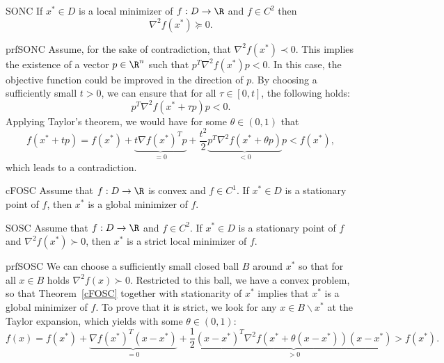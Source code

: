 \begin{theo}{SONC}
    If $x^* \in D$ is a local minimizer of $f: D \to \R$ and $f \in C^2$ then
    \begin{equation*}
        \nabla^2 f(x^*) \succeq 0.
    \end{equation*}
    \vspace*{-0.5cm}
\end{theo}

\begin{prf}{prfSONC}
    Assume, for the sake of contradiction, that $\nabla^2 f(x^*) \prec 0$. This implies the existence of a vector $p \in \R^n$ such that $p^T \nabla^2 f(x^*) p < 0$. In this case, the objective function could be improved in the direction of $p$. By choosing a sufficiently small $t > 0$, we can ensure that for all $\tau \in [0,t]$, the following holds:
    \begin{equation*}
        p^T \nabla^2 f(x^* + \tau p) p < 0.
    \end{equation*}
    Applying Taylor's theorem, we would have for some $\theta \in (0,1)$ that
    \begin{equation*}
        f(x^* + t p) = f(x^*) + \underbrace{t \nabla {f(x^*)}^T p}_{=0} + \frac{t^2}{2} \underbrace{p^T \nabla^2 f(x^* + \theta p)}_{<0} p < f(x^*),
    \end{equation*}
    which leads to a contradiction.
\end{prf}

\begin{theo}{cFOSC}
    Assume that $f: D \to \R$ is convex and $f \in C^1$. If $x^* \in D$ is a stationary point of $f$, then $x^*$ is a global minimizer of $f$.
\end{theo}

\begin{theo}{SOSC}
    Assume that $f: D \to \R$ and $f \in C^2$. If $x^* \in D$ is a stationary point of $f$ and $\nabla^2 f(x^*) \succ 0$, then $x^*$ is a strict local minimizer of $f$.
\end{theo}

\begin{prf}{prfSOSC}
    We can choose a sufficiently small closed ball $B$ around $x^*$ so that for all $x \in B$ holds $\nabla^2 f(x) \succ 0$. Restricted to this ball, we have a convex problem, so that Theorem~\ref{cFOSC} together with stationarity of $x^*$ implies that $x^*$ is a global minimizer of $f$. To prove that it is strict, we look for any $x\in B\backslash x^*$ at the Taylor expansion, which yields with some $\theta \in (0,1)$:
    \begin{equation*}
        f(x) = f(x^*) + \underbrace{\nabla {f(x^*)}^T (x - x^*)}_{=0} + \frac{1}{2} \underbrace{{(x - x^*)}^T \nabla^2 f(x^* + \theta (x - x^*)) (x - x^*)}_{>0} > f(x^*).
    \end{equation*}
    \vspace{-0.5cm}
\end{prf}

